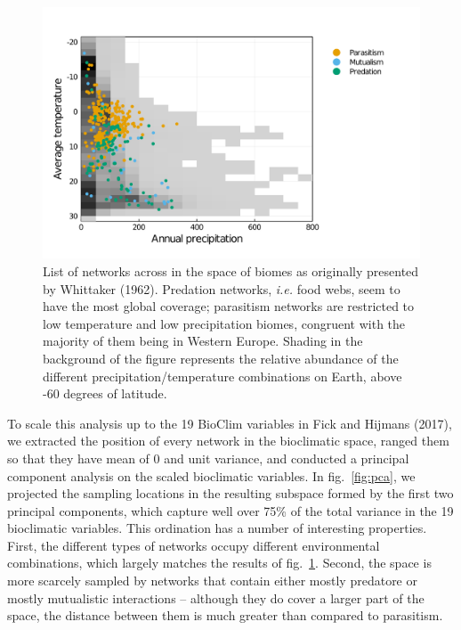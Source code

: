 \documentclass[11pt]{article}
\makeatletter
\def\maxwidth{\ifdim\Gin@nat@width>\linewidth\linewidth
\else\Gin@nat@width\fi}
\let\Oldincludegraphics\includegraphics
\renewcommand{\includegraphics}[1]{\Oldincludegraphics[width=\maxwidth]{#1}}
\makeatother
\begin{document}
\begin{figure}
\hypertarget{fig:biomes}{%
\centering
\includegraphics{figures/networks_by_biomes.png}
\caption{List of networks across in the space of biomes as originally
presented by Whittaker (1962). Predation networks, \emph{i.e.} food
webs, seem to have the most global coverage; parasitism networks are
restricted to low temperature and low precipitation biomes, congruent
with the majority of them being in Western Europe. Shading in the
background of the figure represents the relative abundance of the
different precipitation/temperature combinations on Earth, above -60
degrees of latitude.}\label{fig:biomes}
}
\end{figure}

To scale this analysis up to the 19 BioClim variables in Fick and
Hijmans (2017), we extracted the position of every network in the
bioclimatic space, ranged them so that they have mean of 0 and unit
variance, and conducted a principal component analysis on the scaled
bioclimatic variables. In fig.~\ref{fig:pca}, we projected the sampling
locations in the resulting subspace formed by the first two principal
components, which capture well over 75\% of the total variance in the 19
bioclimatic variables. This ordination has a number of interesting
properties. First, the different types of networks occupy different
environmental combinations, which largely matches the results of
fig.~\ref{fig:biomes}. Second, the space is more scarcely sampled by
networks that contain either mostly predatore or mostly mutualistic
interactions -- although they do cover a larger part of the space, the
distance between them is much greater than compared to parasitism.
\end{document}
